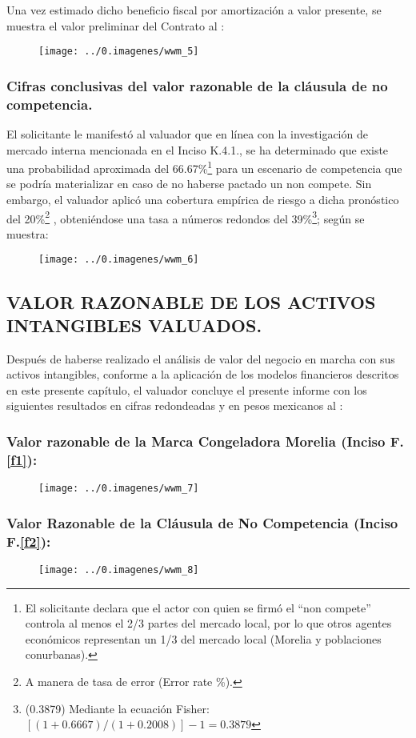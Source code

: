 Una vez estimado dicho beneficio fiscal por amortización a valor presente, se muestra el valor preliminar del Contrato al \fechaValores:

\begin{figure}[H]
\centering
\texttt{[image: ../0.imagenes/wwm\_5]}
\end{figure}

\subsubsection{Cifras conclusivas del valor razonable de la cláusula de no competencia.}

 El solicitante le manifestó al valuador que en línea con la investigación de mercado interna mencionada en el Inciso K.4.1., se ha determinado que existe una probabilidad aproximada del 66.67\%\footnote{El solicitante declara que el actor con quien se firmó el ``non compete'' controla al menos el 2/3 partes del mercado local, por lo que otros agentes económicos representan un 1/3 del mercado local (Morelia y poblaciones conurbanas).}  para un escenario de competencia que se podría materializar en caso de no haberse pactado un non compete. Sin embargo, el valuador aplicó una cobertura empírica de riesgo a dicha pronóstico del 20\%\footnote{A manera de tasa de error (Error rate \%).} , obteniéndose una tasa a números redondos del 39\%\footnote{(0.3879) Mediante la ecuación Fisher: $[(1 + 0.6667) / (1 + 0.2008)] - 1 = 0.3879$}; según se muestra:

\begin{figure}[H]
\centering
\texttt{[image: ../0.imagenes/wwm\_6]}
\end{figure}


\subsection{VALOR RAZONABLE DE LOS ACTIVOS INTANGIBLES VALUADOS.}

Después de haberse realizado el análisis de valor del negocio en marcha con sus activos intangibles, conforme a la aplicación de los modelos financieros descritos en este presente capítulo, el valuador concluye el presente informe con los siguientes resultados en cifras redondeadas y en pesos mexicanos al \fechaValores:

\subsubsection{Valor razonable de la Marca Congeladora Morelia (Inciso F.\ref{f1}):}

\begin{figure}[H]
\centering
\texttt{[image: ../0.imagenes/wwm\_7]}
\end{figure}

\subsubsection{Valor Razonable de la Cláusula de No Competencia (Inciso F.\ref{f2}):}

\begin{figure}[H]
\centering
\texttt{[image: ../0.imagenes/wwm\_8]}
\end{figure}

